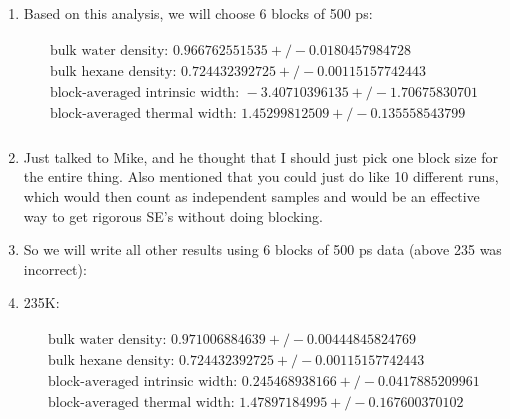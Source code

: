 \documentclass[12pt,reqno]{amsart}
\numberwithin{equation}{section}
\begin{document}
\begin{enumerate}
\item Based on this analysis, we will choose 6 blocks of 500 ps:

\begin{align}
\begin{split}
\text{bulk water density: } 0.966762551535  +/- 0.0180457984728 \\
\text{bulk hexane density: } 0.724432392725  +/- 0.00115157742443\\
\text{block-averaged intrinsic width: } -3.40710396135  +/- 1.70675830701\\
\text{block-averaged thermal width: } 1.45299812509  +/- 0.135558543799 \\
\end{split}
\end{align} 



\item Just talked to Mike, and he thought that I should just pick one block size for the entire thing.  Also mentioned that you could just do like 10 different runs, which would then count as independent samples and would be an effective way to get rigorous SE's without doing blocking.  

\item So we will write all other results using 6 blocks of 500 ps data (above 235 was incorrect): 

\item 235K: 

\begin{align}
\begin{split}
\text{bulk water density: } 0.971006884639  +/- 0.00444845824769 \\
\text{bulk hexane density: } 0.724432392725  +/- 0.00115157742443\\
\text{block-averaged intrinsic width: } 0.245468938166  +/- 0.0417885209961\\
\text{block-averaged thermal width: } 1.47897184995  +/- 0.167600370102 \\
\end{split}
\end{align} 


\end{enumerate}
\end{document}
